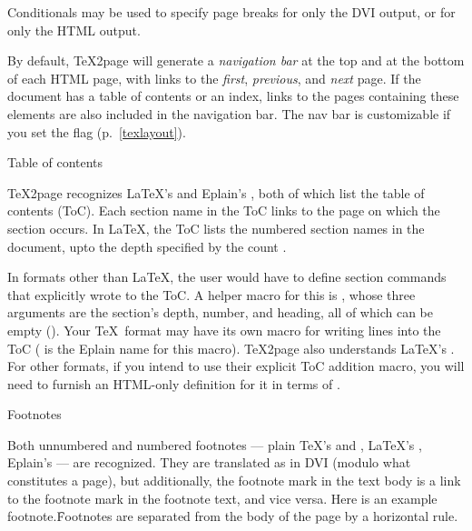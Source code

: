 Conditionals may be used to specify page breaks for
only the DVI output, or for only the HTML output.

By default, \TeX2page will generate a {\em navigation
bar} at the top and at the bottom of each HTML page, with
links to the {\em first}, {\em
previous}, and {\em next} page.
If the document has a table of contents or
an index, links to the pages containing these elements are
also included in the
navigation bar.  The nav bar is customizable if you set the
\p{\TZPtexlayout} flag (p.~\ref{texlayout}).

\beginsection Table of contents

%
\TeX2page recognizes \LaTeX’s \p{\tableofcontents} and
Eplain’s \p{\readtocfile}, both of which list the table
of contents (ToC). Each section name in the ToC links to the
page on which the section occurs.  In \LaTeX, the ToC
lists the numbered section names in the document, upto
the depth specified by the count \p{\tocdepth}.

%
In formats other than \LaTeX, the user would have to
define section commands that explicitly wrote to the
ToC.  A helper macro for this is
\p{\writenumberedtocline}, whose three arguments are
the section’s depth, number, and heading, all of which
can be empty (\p{{}}).  Your \TeX\ format may have its
own macro for writing lines into the ToC
(\p{\writenumberedtocline} is the Eplain name for this
macro).  \TeX2page also understands \LaTeX’s
\p{\addcontentsline}.  For other formats, if you intend
to use their explicit ToC addition macro, you will need
to furnish an HTML-only definition for it in terms of
\p{\writenumberedtocline}.

\beginsection Footnotes

Both unnumbered and numbered footnotes — plain \TeX’s
\p{\footnote} and \p{\vfootnote},
LaTeX’s \p{\footnote}, Eplain’s
\p{\numberedfootnote} — are recognized.
They are translated as in DVI (modulo what constitutes
a page), but additionally, the footnote mark in the text body
is a link to the footnote mark in the footnote text,
and vice versa.  Here is an example
footnote.\f{Footnotes are separated from the body of
the page by a horizontal rule.}

